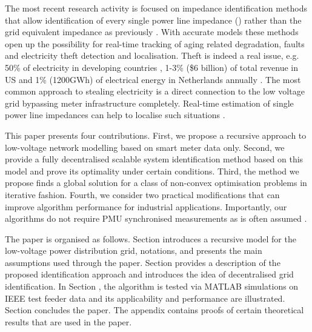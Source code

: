 \documentclass[journal,10pt,onecolumn,draftclsnofoot,]{IEEEtran}
\newcommand{\RNum}[1]{\uppercase\expandafter{\romannumeral #1\relax}}
\theoremstyle{plain}
\theoremstyle{definition}
\theoremstyle{remark}
\begin{document}
The most recent research activity is focused on impedance identification methods that allow identification of every single power line impedance (\cite{han2016automated, yang2010online}) rather than the grid equivalent impedance as previously \cite{cobreces2009grid, ciobotaru2011line}. With accurate models these methods open up the possibility for real-time tracking of aging related degradation, faults and electricity theft detection and localisation. Theft is indeed a real issue, e.g. 50\% of electricity in developing countries \cite{tariq2016electricity}, 1-3\% (\$6 billion) of total revenue in US \cite{van2011electricity} and 1\% (1200GWh) of electrical energy in Netherlands annually \cite{sahoo2015electricity}. The most common approach to stealing electricity is a direct connection to the low voltage grid bypassing meter infrastructure completely. Real-time estimation of single power line impedances can help to localise such situations \cite{tariq2016electricity}.  

This paper presents four contributions. First, we propose a recursive approach to low-voltage network modelling based on smart meter data only. Second, we provide a fully decentralised scalable system identification method based on this model and prove its optimality under certain conditions. Third, the method we propose finds a global solution for a class of non-convex optimisation problems in iterative fashion. Fourth, we consider two practical modifications that can improve algorithm performance for industrial applications. Importantly, our algorithms do not require PMU synchronised measurements as is often assumed \cite{de2010synchronized}. 

The paper is organised as follows. Section \RNum{2} introduces a recursive model for the low-voltage power distribution grid, notations, and presents the main assumptions used through the paper. Section \RNum{3} provides a description of the proposed identification approach and introduces the idea of decentralised grid identification. In Section \RNum{4}, the algorithm is tested via MATLAB simulations on IEEE test feeder data and its applicability and performance are illustrated. Section \RNum{5} concludes the paper. The appendix contains proofs of certain theoretical results that are used in the paper. 

\end{document}
